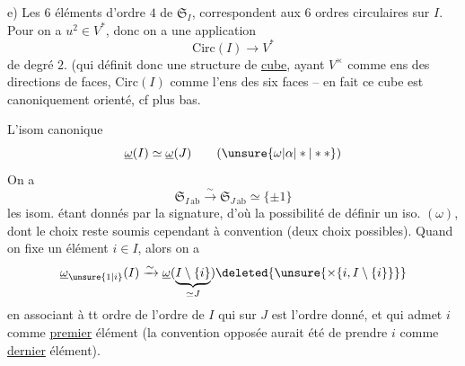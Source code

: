e) Les $6$ éléments d'ordre $4$ de $\mathfrak{S}_I$, correspondent aux $6$ ordres circulaires sur $I$. Pour
 on a $u^2\in V^*$, donc on a une application
\[
\mathrm{Circ}(I)\longrightarrow V^*
\]
de degré $2$. (qui définit donc une structure de \uline{cube}, ayant $V^\times$ comme ens des directions de faces, $\mathrm{Circ}(I)$ comme l'ens des six faces -- en fait ce cube est canoniquement orienté, cf plus bas.

L'isom canonique
\[
\underline{\omega}(I)\simeq\underline{\omega}(J)\tag*{$(\unsure{\omega|\alpha|*|**})$}
\]
On a
\[
\mathfrak{S}_{I\,\mathrm{ab}}\xrightarrow{\sim}\mathfrak{S}_{J\,\mathrm{ab}}\simeq\{\pm1\}
\]
les isom. étant donnés par la signature, d'où la possibilité de définir un iso.   $(\omega)$, dont le choix reste soumis cependant à convention (deux choix possibles). Quand on fixe un élément $i\in I$, alors on a
\[
\underline{\omega}_{\unsure{1|i}}(I)\xrightarrow{\sim}\underline{\omega}(\underbrace{I\setminus\{i\}}_{\simeq J})\deleted{\unsure{\times\{i,I\setminus\{i\}\}}}
\]
en associant à tt ordre  de  l'ordre   de $I$ qui sur $J$ est l'ordre donné, et qui admet $i$ comme \uline{premier} élément (la convention opposée aurait été de prendre $i$ comme \uline{dernier} élément).

